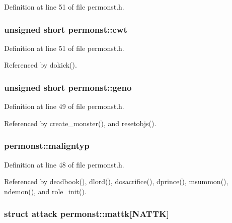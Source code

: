 Definition at line 51 of file permonst.\+h.

\hypertarget{structpermonst_aee69b23cdcca0ae25f25eff876ab86ae}{
\subsubsection[{cwt}]{\setlength{\rightskip}{0pt plus 5cm}unsigned short permonst\+::cwt}}\label{structpermonst_aee69b23cdcca0ae25f25eff876ab86ae}


Definition at line 51 of file permonst.\+h.



Referenced by dokick().

\hypertarget{structpermonst_a0f9f93635f6228a61551c835640b3c1d}{
\subsubsection[{geno}]{\setlength{\rightskip}{0pt plus 5cm}unsigned short permonst\+::geno}}\label{structpermonst_a0f9f93635f6228a61551c835640b3c1d}


Definition at line 49 of file permonst.\+h.



Referenced by create\+\_\+monster(), and resetobjs().

\hypertarget{structpermonst_ad92ab559c3dc08cc1a40f3413377d787}{
\subsubsection[{maligntyp}]{ permonst\+::maligntyp}}\label{structpermonst_ad92ab559c3dc08cc1a40f3413377d787}


Definition at line 48 of file permonst.\+h.



Referenced by deadbook(), dlord(), dosacrifice(), dprince(), msummon(), ndemon(), and role\+\_\+init().

\hypertarget{structpermonst_a8a558cbb5f8985df95bffa4439856374}{
\subsubsection[{mattk}]{\setlength{\rightskip}{0pt plus 5cm}struct {\bf attack} permonst\+::mattk\mbox{[}{\bf N\+A\+T\+T\+K}\mbox{]}}}\label{structpermonst_a8a558cbb5f8985df95bffa4439856374}


